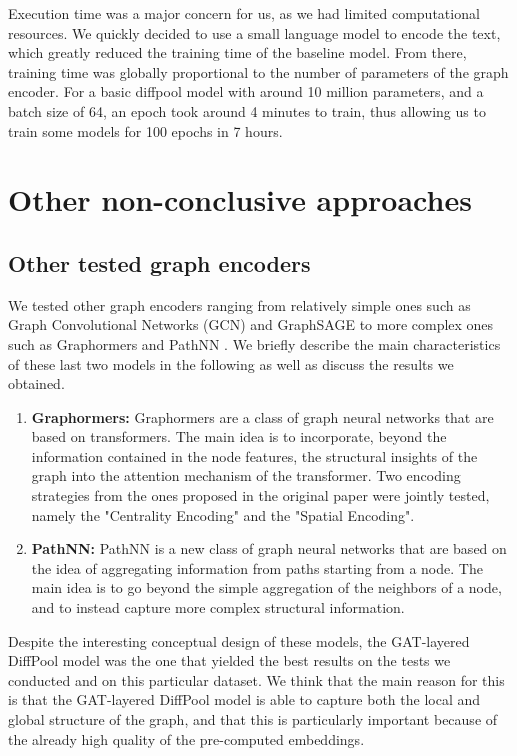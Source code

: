 \documentclass[switch, 11pt]{article}
\begin{document}
\begin{multicols}{2}
    Execution time was a major concern for us, as we had limited computational resources. We quickly decided to use a small language model to encode the text, which greatly reduced the training time of the baseline model. From there, training time was globally proportional to the number of parameters of the graph encoder. For a basic diffpool model with around 10 million parameters, and a batch size of 64, an epoch took around 4 minutes to train, thus allowing us to train some models for 100 epochs in 7 hours.

    \section{Other non-conclusive approaches}
    \label{sec:non-conclusive}
    \subsection{Other tested graph encoders}
    We tested other graph encoders ranging from relatively simple ones such as Graph Convolutional Networks (GCN) \cite{gcn}  and GraphSAGE \cite{graphsage} to more complex ones such as Graphormers \cite{graphormers} and PathNN \cite{pathnn}. We briefly describe the main characteristics of these last two models in the following as well as discuss the results we obtained.
    \begin{enumerate}
        \item \textbf{Graphormers: } Graphormers are a class of graph neural networks that are based on transformers. The main idea is to incorporate, beyond the information contained in the node features,  the structural insights of the graph into the attention mechanism of the transformer. Two encoding strategies from the ones proposed in the original paper \cite{graphormers} were jointly tested, namely the "Centrality Encoding" and the "Spatial Encoding".
        \item \textbf{PathNN: } PathNN \cite{pathnn} is a new class of graph neural networks that are based on the idea of aggregating information from paths starting from a node. The main idea is to go beyond the simple aggregation of the neighbors of a node, and to instead capture more complex structural information.
    \end{enumerate}
    Despite the interesting conceptual design of these models, the GAT-layered DiffPool model was the one that yielded the best results on the tests we conducted and on this particular dataset. We think that the main reason for this is that the GAT-layered DiffPool model is able to capture both the local and global structure of the graph, and that this is particularly important because of the already high quality of the pre-computed embeddings.

\end{multicols}
\end{document}
